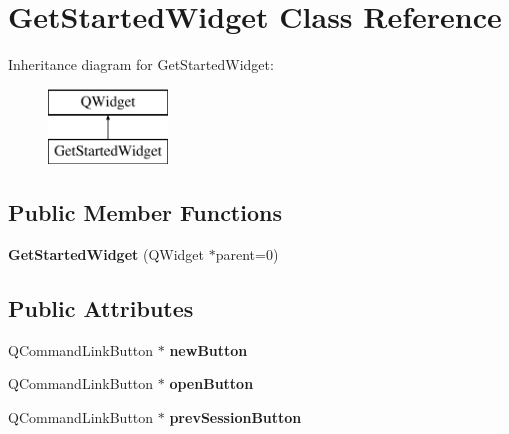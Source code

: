 \hypertarget{class_get_started_widget}{}\section{Get\+Started\+Widget Class Reference}
\label{class_get_started_widget}
Inheritance diagram for Get\+Started\+Widget\+:\begin{figure}[H]
\begin{center}
\leavevmode
\includegraphics[height=2.000000cm]{class_get_started_widget}
\end{center}
\end{figure}
\subsection*{Public Member Functions}
\begin{DoxyCompactItemize}
\item 
\hypertarget{class_get_started_widget_a9cfb08d5e11309e0af9e8711a09adffa}{}{\bfseries Get\+Started\+Widget} (Q\+Widget $\ast$parent=0)\label{class_get_started_widget_a9cfb08d5e11309e0af9e8711a09adffa}

\end{DoxyCompactItemize}
\subsection*{Public Attributes}
\begin{DoxyCompactItemize}
\item 
\hypertarget{class_get_started_widget_af23faf9268f1e4632084bba304c85c36}{}Q\+Command\+Link\+Button $\ast$ {\bfseries new\+Button}\label{class_get_started_widget_af23faf9268f1e4632084bba304c85c36}

\item 
\hypertarget{class_get_started_widget_a2cc201c00b37e685949d614f8bf29df8}{}Q\+Command\+Link\+Button $\ast$ {\bfseries open\+Button}\label{class_get_started_widget_a2cc201c00b37e685949d614f8bf29df8}

\item 
\hypertarget{class_get_started_widget_a91a3519b78e9cf1012f0119299b7af42}{}Q\+Command\+Link\+Button $\ast$ {\bfseries prev\+Session\+Button}\label{class_get_started_widget_a91a3519b78e9cf1012f0119299b7af42}

\end{DoxyCompactItemize}
